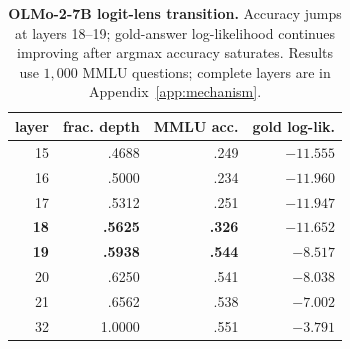 \begin{table}[t]
\centering
\small
\setlength{\tabcolsep}{4.5pt}
\begin{tabular}{@{}rrrr@{}}
\toprule
\textbf{layer} & \textbf{frac. depth} & \textbf{MMLU acc.} &
\textbf{gold log-lik.} \\
\midrule
15 & .4688 & .249 & $-11.555$ \\
16 & .5000 & .234 & $-11.960$ \\
17 & .5312 & .251 & $-11.947$ \\
\textbf{18} & \textbf{.5625} & \textbf{.326} & $-11.652$ \\
\textbf{19} & \textbf{.5938} & \textbf{.544} & $\mathbf{-8.517}$ \\
20 & .6250 & .541 & $-8.038$ \\
21 & .6562 & .538 & $-7.002$ \\
32 & 1.0000 & .551 & $-3.791$ \\
\bottomrule
\end{tabular}
\caption{\textbf{OLMo-2-7B logit-lens transition.} Accuracy jumps at layers
18--19; gold-answer log-likelihood continues improving after argmax accuracy
saturates. Results use $1{,}000$ MMLU questions; complete layers are in
Appendix~\ref{app:mechanism}.}
\label{tab:logitlens-transition}
\end{table}
